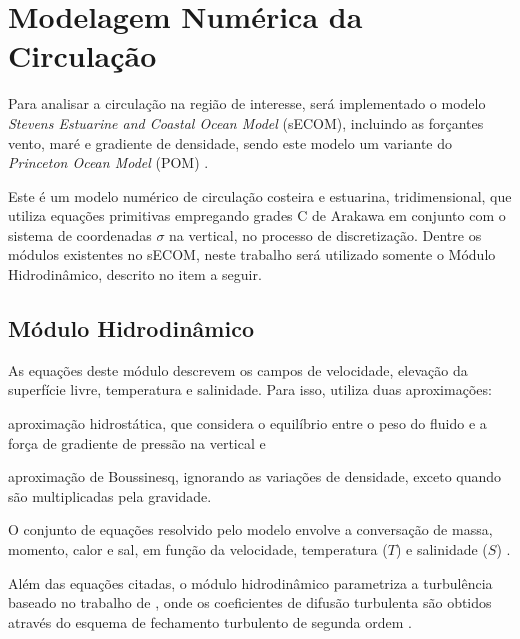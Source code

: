 \section{Modelagem Numérica da Circulação}
\label{sec:numericalModelling}


\hspace{5mm} Para analisar a circulação na região de interesse, será implementado o modelo \textit{Stevens
Estuarine and Coastal Ocean Model} (sECOM), incluindo as forçantes vento, maré e gradiente de densidade,
sendo este modelo um variante do \textit{Princeton Ocean Model} (POM) \citep{Blumberg1987}.

\hspace{5mm} Este é um modelo numérico de circulação costeira e estuarina, tridimensional, que utiliza equações primitivas empregando
grades C de Arakawa em conjunto com o sistema de coordenadas $\sigma$ na vertical, no processo de discretização.
Dentre os módulos existentes no sECOM, neste trabalho será utilizado somente o Módulo Hidrodinâmico,
descrito no item a seguir.


\subsection{Módulo Hidrodinâmico}
\label{sub:hydrodynamicModule}

\hspace{5mm} As equações deste módulo descrevem os campos de velocidade, elevação da superfície livre,
temperatura e salinidade. Para isso, utiliza duas aproximações:
\begin{enumerate*}[label=(\alph*)]
  \item aproximação hidrostática, que considera o equilíbrio entre o peso do fluido e a força de gradiente de
  pressão na vertical e
  \item aproximação de Boussinesq, ignorando as variações de densidade, exceto quando são multiplicadas pela
  gravidade.
\end{enumerate*}
O conjunto de equações resolvido pelo modelo envolve a conversação de massa, momento, calor e
sal, em função da velocidade, temperatura ($T$) e salinidade ($S$) \citep{Harbor1999}.

\hspace{5mm} Além das equações citadas, o módulo hidrodinâmico parametriza a turbulência baseado no trabalho de 
\citep{mellor1974hierarchy}, onde os coeficientes de difusão turbulenta são obtidos através do esquema de fechamento turbulento de segunda ordem \cite{mellor1982development}.

